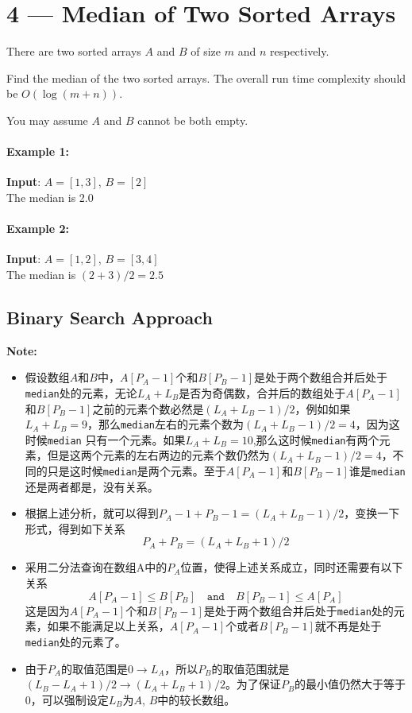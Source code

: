\documentclass[a4paper,12pt]{article}
\begin{document}
\section{4 --- Median of Two Sorted Arrays}
There are two sorted arrays $A$ and $B$ of size $m$ and $n$ respectively.
\par
Find the median of the two sorted arrays. The overall run time complexity should be $O(\log (m+n))$.
\par
You may assume $A$ and $B$ cannot be both empty.
\paragraph{Example 1:}
\begin{flushleft}
\textbf{Input}: $A = [1, 3]$, $B = [2]$
\\
The median is 2.0
\end{flushleft}
\paragraph{Example 2:}
\begin{flushleft}
\textbf{Input}: $A = [1, 2]$, $B = [3, 4]$
\\
The median is $(2 + 3)/2 = 2.5$
\end{flushleft}
\subsection{Binary Search Approach}
\textbf{\large{Note:}}
\par
\vspace{0.5em}
\begin{CJK*}{UTF8}{gbsn}
\begin{itemize}
\item 假设数组$A$和$B$中，$A[P_A-1]$个和$B[P_B-1]$是处于两个数组合并后处于\texttt{median}处的元素，无论$L_A+L_B$是否为奇偶数，合并后的数组处于$A[P_A-1]$和$B[P_B-1]$之前的元素个数必然是$(L_A+L_B-1)/2$，例如如果$L_A+L_B = 9$，那么\texttt{median}左右的元素个数为$(L_A+L_B-1)/2=4$，因为这时候\texttt{median} 只有一个元素。如果$L_A+L_B = 10$,那么这时候\texttt{median}有两个元素，但是这两个元素的左右两边的元素个数仍然为$(L_A+L_B-1)/2=4$，不同的只是这时候\texttt{median}是两个元素。至于$A[P_A-1]$和$B[P_B-1]$谁是\texttt{median}还是两者都是，没有关系。
\item 根据上述分析，就可以得到$P_A-1+P_B-1 =(L_A+L_B-1)/2 $，变换一下形式，得到如下关系
\[
P_A + P_B = (L_A+L_B+1)/2
\]
\item 采用二分法查询在数组A中的$P_A$位置，使得上述关系成立，同时还需要有以下关系
\[
A[P_A - 1] \leq B[P_B] \quad \mathtt{and} \quad B[P_B - 1] \leq A[P_A]
\]
这是因为$A[P_A-1]$个和$B[P_B-1]$是处于两个数组合并后处于\texttt{median}处的元素，如果不能满足以上关系，$A[P_A-1]$个或者$B[P_B-1]$就不再是处于\texttt{median}处的元素了。
\item 由于$P_A$的取值范围是$0\to L_A$，所以$P_B$的取值范围就是$(L_B-L_A+1)/2 \to (L_A+L_B+1)/2$。为了保证$P_B$的最小值仍然大于等于0，可以强制设定$L_B$为$A$, $B$中的较长数组。
\end{itemize}
\end{CJK*}
\end{document}
